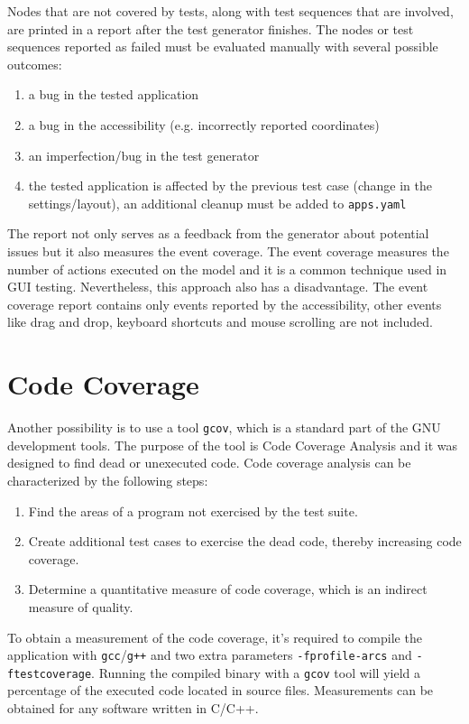 Nodes that are not covered by tests, along with test sequences that are involved, are printed in a report after the test generator finishes.  The nodes or test sequences reported as failed must be evaluated manually with several possible outcomes:
\begin{enumerate}
    \item a bug in the tested application
    \item a bug in the accessibility (e.g. incorrectly reported coordinates)
    \item an imperfection/bug in the test generator
    \item the tested application is affected by the previous test case (change in the settings/layout), an additional cleanup must be added to \texttt{apps.yaml}
\end{enumerate}
The report not only serves as a feedback from the generator about potential issues but it also measures the event coverage. The event coverage measures the number of actions executed on the model and it is a common technique used in GUI testing\cite{NguyenBao2014Gait}.
Nevertheless, this approach also has a disadvantage. The event coverage report contains only events reported by the accessibility, other events like drag and drop, keyboard shortcuts and mouse scrolling are not included.

\section{Code Coverage}
Another possibility is to use a tool \verb|gcov|, which is a standard part of the GNU development tools. The purpose of the tool is Code Coverage Analysis and it was designed to find dead or unexecuted code. Code coverage analysis can be characterized by the following steps: 
\begin{enumerate}
  \item Find the areas of a program not exercised by the test suite.
  \item Create additional test cases to exercise the dead code, thereby increasing code coverage.
  \item Determine a quantitative measure of code coverage, which is an indirect measure of quality.
\end{enumerate}

To obtain a measurement of the code coverage, it's required to compile the application with \verb|gcc|/\verb|g++| and two extra parameters \verb|-fprofile-arcs| and \verb|-ftestcoverage|. Running the compiled binary with a \verb|gcov| tool will yield a percentage of the executed code located in source files. Measurements can be obtained for any software written in C/C++.\cite{gcov} 

